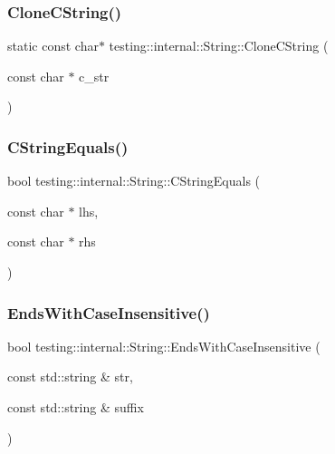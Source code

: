 \subsubsection{\texorpdfstring{CloneCString()}{CloneCString()}}
{\footnotesize\ttfamily static const char$\ast$ testing\+::internal\+::\+String\+::\+Clone\+C\+String (\begin{DoxyParamCaption}\item[{const char $\ast$}]{c\+\_\+str }\end{DoxyParamCaption})\hspace{0.3cm}{\ttfamily [static]}}

\mbox{\label{classtesting_1_1internal_1_1String_a8bea7b33e7effbd299a0b4a5522ea96e}} 
\subsubsection{\texorpdfstring{CStringEquals()}{CStringEquals()}}
{\footnotesize\ttfamily bool testing\+::internal\+::\+String\+::\+C\+String\+Equals (\begin{DoxyParamCaption}\item[{const char $\ast$}]{lhs,  }\item[{const char $\ast$}]{rhs }\end{DoxyParamCaption})\hspace{0.3cm}{\ttfamily [static]}}

\mbox{\label{classtesting_1_1internal_1_1String_a968f242b709f8c7c0ed5ecf246553321}} 
\subsubsection{\texorpdfstring{EndsWithCaseInsensitive()}{EndsWithCaseInsensitive()}}
{\footnotesize\ttfamily bool testing\+::internal\+::\+String\+::\+Ends\+With\+Case\+Insensitive (\begin{DoxyParamCaption}\item[{const std\+::string \&}]{str,  }\item[{const std\+::string \&}]{suffix }\end{DoxyParamCaption})\hspace{0.3cm}{\ttfamily [static]}}

